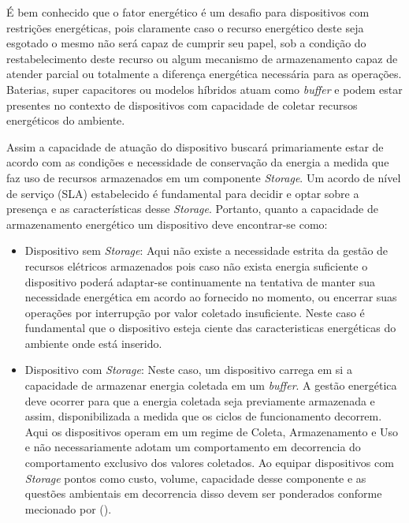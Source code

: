 É bem conhecido que o fator energético é um desafio para dispositivos com restrições energéticas, pois claramente caso o recurso energético deste seja esgotado o mesmo não será capaz de cumprir seu papel, sob a condição do restabelecimento deste recurso ou algum mecanismo de armazenamento capaz de atender parcial ou totalmente a diferença energética necessária para as operações. Baterias, super capacitores ou modelos híbridos atuam como \textit{buffer} e podem estar presentes no contexto de dispositivos com capacidade de coletar recursos energéticos do ambiente.

Assim a capacidade de atuação do dispositivo buscará primariamente estar de acordo com as condições e necessidade de conservação da energia a medida que faz uso de recursos armazenados em um componente \textit{Storage}. Um acordo de nível de serviço (\acl{SLA}) estabelecido é fundamental para decidir e optar sobre a presença e as características desse \textit{Storage}. Portanto, quanto a capacidade de armazenamento energético um dispositivo deve encontrar-se como: 

\begin{itemize}
    \item Dispositivo sem \textit{Storage}: Aqui não existe a necessidade estrita da gestão de recursos elétricos armazenados pois caso não exista energia suficiente o dispositivo poderá adaptar-se continuamente na tentativa de manter sua necessidade energética em acordo ao fornecido no momento, ou encerrar suas operações por interrupção por valor coletado insuficiente. Neste caso é fundamental que o dispositivo esteja ciente das caracteristicas energéticas do ambiente onde está inserido.
    
    \item Dispositivo com \textit{Storage}: Neste caso, um dispositivo carrega em si a capacidade de armazenar energia coletada em um \textit{buffer}. A gestão energética deve ocorrer para que a energia coletada seja previamente armazenada e assim, disponibilizada a medida que os ciclos de funcionamento decorrem. Aqui os dispositivos operam em um regime de Coleta, Armazenamento e Uso e não necessariamente adotam um comportamento em decorrencia do comportamento exclusivo dos valores coletados. Ao equipar dispositivos com \textit{Storage} pontos como custo, volume, capacidade desse componente e as questões ambientais em decorrencia disso devem ser ponderados conforme mecionado por \citeauthor{merrett_energy-driven_2017}(\citeyear{merrett_energy-driven_2017}).

\end{itemize}

